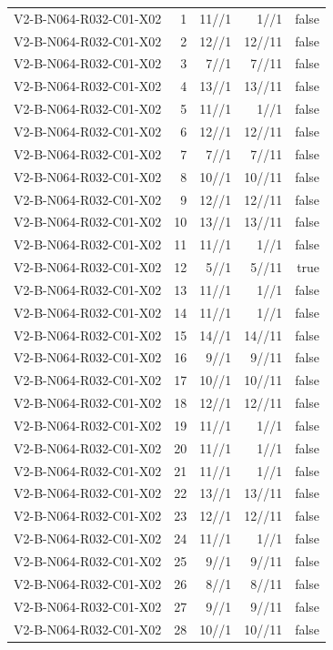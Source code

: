 {\begin{longtable}{lrrrr}
V2-B-N064-R032-C01-X02 & 1 & 11//1 & 1//1 & false \\
V2-B-N064-R032-C01-X02 & 2 & 12//1 & 12//11 & false \\
V2-B-N064-R032-C01-X02 & 3 & 7//1 & 7//11 & false \\
V2-B-N064-R032-C01-X02 & 4 & 13//1 & 13//11 & false \\
V2-B-N064-R032-C01-X02 & 5 & 11//1 & 1//1 & false \\
V2-B-N064-R032-C01-X02 & 6 & 12//1 & 12//11 & false \\
V2-B-N064-R032-C01-X02 & 7 & 7//1 & 7//11 & false \\
V2-B-N064-R032-C01-X02 & 8 & 10//1 & 10//11 & false \\
V2-B-N064-R032-C01-X02 & 9 & 12//1 & 12//11 & false \\
V2-B-N064-R032-C01-X02 & 10 & 13//1 & 13//11 & false \\
V2-B-N064-R032-C01-X02 & 11 & 11//1 & 1//1 & false \\
V2-B-N064-R032-C01-X02 & 12 & 5//1 & 5//11 & true \\
V2-B-N064-R032-C01-X02 & 13 & 11//1 & 1//1 & false \\
V2-B-N064-R032-C01-X02 & 14 & 11//1 & 1//1 & false \\
V2-B-N064-R032-C01-X02 & 15 & 14//1 & 14//11 & false \\
V2-B-N064-R032-C01-X02 & 16 & 9//1 & 9//11 & false \\
V2-B-N064-R032-C01-X02 & 17 & 10//1 & 10//11 & false \\
V2-B-N064-R032-C01-X02 & 18 & 12//1 & 12//11 & false \\
V2-B-N064-R032-C01-X02 & 19 & 11//1 & 1//1 & false \\
V2-B-N064-R032-C01-X02 & 20 & 11//1 & 1//1 & false \\
V2-B-N064-R032-C01-X02 & 21 & 11//1 & 1//1 & false \\
V2-B-N064-R032-C01-X02 & 22 & 13//1 & 13//11 & false \\
V2-B-N064-R032-C01-X02 & 23 & 12//1 & 12//11 & false \\
V2-B-N064-R032-C01-X02 & 24 & 11//1 & 1//1 & false \\
V2-B-N064-R032-C01-X02 & 25 & 9//1 & 9//11 & false \\
V2-B-N064-R032-C01-X02 & 26 & 8//1 & 8//11 & false \\
V2-B-N064-R032-C01-X02 & 27 & 9//1 & 9//11 & false \\
V2-B-N064-R032-C01-X02 & 28 & 10//1 & 10//11 & false \\

\end{longtable}}
